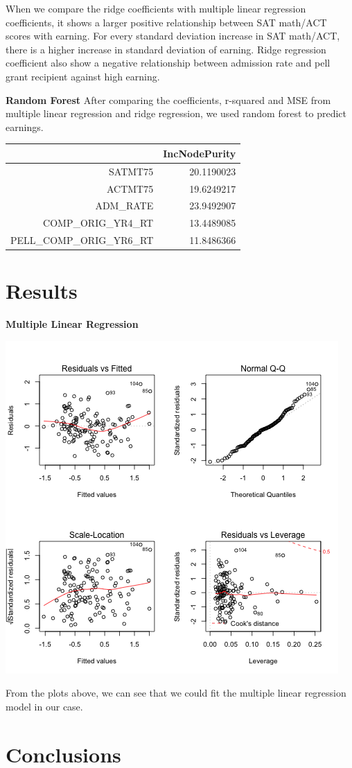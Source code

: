 \documentclass{article}
\begin{document}
When we compare the ridge coefficients with multiple linear regression coefficients, it shows a larger positive relationship between SAT math/ACT scores with earning. For every standard deviation increase in SAT math/ACT, there is a higher increase in standard deviation of earning. Ridge regression coefficient also show a negative relationship between admission rate and pell grant recipient against high earning.
\newline
\newline

\textbf{Random Forest} \newline
After comparing the coefficients, r-squared and MSE from multiple linear regression and ridge regression, we used random forest to predict earnings. 

\begin{table}[ht]
\centering
\begin{tabular}{rr}
  \hline
 & IncNodePurity \\ 
  \hline
SATMT75 & 20.1190023 \\ 
  ACTMT75 & 19.6249217 \\ 
  ADM\_RATE & 23.9492907 \\ 
  COMP\_ORIG\_YR4\_RT & 13.4489085 \\ 
  PELL\_COMP\_ORIG\_YR6\_RT & 11.8486366 \\ 
   \hline
\end{tabular}
\end{table}



\section{Results}

\textbf{Multiple Linear Regression}\newline

\includegraphics{images/lm_low.png}

From the plots above, we can see that we could fit the multiple linear regression model in our case. 


\section{Conclusions}
\end{document}

